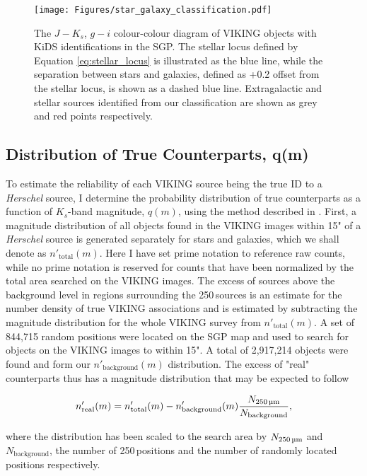 \begin{figure}
	\texttt{[image: Figures/star\_galaxy\_classification.pdf]}
	\caption{The $J - K_s$, $g-i$ colour-colour diagram of VIKING objects with KiDS identifications in the SGP. The stellar locus defined by Equation \ref{eq:stellar_locus} is illustrated as the blue line, while the separation between stars and galaxies, defined as +0.2 offset from the stellar locus, is shown as a dashed blue line. Extragalactic and stellar sources identified from our classification are shown as grey and red points respectively.}
	\label{fig:star_galaxy_classification}
\end{figure}

\subsection{Distribution of True Counterparts, q(m)}

To estimate the reliability of each VIKING source being the true ID to a \textit{Herschel} source, I determine the probability distribution of true counterparts as a function of $K_s$-band magnitude, $q(m)$, using the method described in \citealt{Ciliegi_2003}. First, a magnitude distribution of all objects found in the VIKING images within 15" of a \textit{Herschel} source is generated separately for stars and galaxies, which we shall denote as $n'_{\textrm{total}}(m)$. Here I have set prime notation to reference raw counts, while no prime notation is reserved for counts that have been normalized by the total area searched on the VIKING images. The excess of sources above the background level in regions surrounding the 250\,\micron sources is an estimate for the number density of true VIKING associations and is estimated by subtracting the magnitude distribution for the whole VIKING survey from $n'_{\textrm{total}}(m)$. A set of 844,715 random positions were located on the SGP map and used to search for objects on the VIKING images to within 15". A total of 2,917,214 objects were found and form our $n'_{\textrm{background}}(m)$ distribution. The excess of "real" counterparts thus has a magnitude distribution that may be expected to follow

\begin{equation}
    n'_{\textrm{real}}(m) = n'_{\textrm{total}}(m) - n'_{\textrm{background}}(m) \frac{N_{\textrm{250\,\micron}}}{N_{\textrm{background}}},
\end{equation}

where the distribution has been scaled to the search area by $N_{\textrm{250\,\micron}}$ and $N_{\textrm{background}}$, the number of 250\,\micron positions and the number of randomly located positions respectively.

